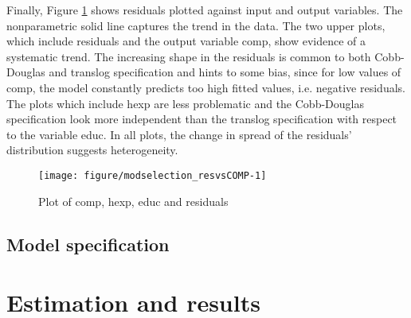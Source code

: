 \documentclass[12pt,a4paper]{article}\usepackage[]{graphicx}\usepackage[]{color}
\newenvironment{knitrout}{}{} %
\begin{document}
Finally, Figure \ref{fig:modselection_resvsCOMP} shows residuals plotted against input and output variables. The nonparametric solid line captures the trend in the data. The two upper plots, which include residuals and the output variable comp, show evidence of a systematic trend. The increasing shape in the residuals is common to both Cobb-Douglas and translog specification and hints to some bias, since for low values of comp, the model constantly predicts too high fitted values, i.e. negative residuals. The plots which include hexp are less problematic and the Cobb-Douglas specification look more independent than the translog specification with respect to the variable educ. In all plots, the change in spread of the residuals' distribution suggests heterogeneity.

\begin{knitrout}
\color{fgcolor}\begin{figure}[htbp]

{\centering \texttt{[image: figure/modselection\_resvsCOMP-1]} 

}

\caption[Plot of comp, hexp, educ and residuals]{Plot of comp, hexp, educ and residuals}\label{fig:modselection_resvsCOMP}
\end{figure}


\end{knitrout}











\subsection{Model specification}













\section{Estimation and results}
\end{document}
